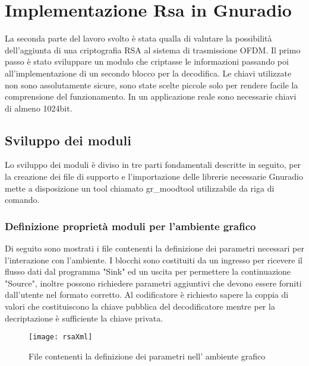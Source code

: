 \chapter{Implementazione Rsa in Gnuradio}
\label{cha:999}
La seconda parte del lavoro svolto è stata qualla di valutare la possibilità dell'aggiunta di una criptografia RSA al sistema di trasmissione OFDM. Il primo passo è stato sviluppare un modulo che criptasse le informazioni passando poi all'implementazione di un secondo blocco per la decodifica. Le chiavi utilizzate non sono assolutamente sicure, sono state scelte piccole solo per rendere facile la comprensione del funzionamento. In un applicazione reale sono necessarie chiavi di almeno 1024bit.
\section{Sviluppo dei moduli}
Lo sviluppo dei moduli è diviso in tre parti fondamentali descritte in seguito, per la creazione dei file di supporto e l'importazione delle librerie necessarie Gnuradio mette a disposizione un tool chiamato gr\_moodtool utilizzabile da riga di comando.
\subsection{Definizione proprietà moduli per l'ambiente grafico}
Di seguito sono mostrati i file contenenti la definizione dei parametri necessari per l'interazione con l'ambiente. I blocchi sono costituiti da un ingresso per ricevere il flusso dati dal programma "Sink" ed un uscita per permettere la continuazione "Source", inoltre possono richiedere parametri aggiuntivi che devono essere forniti dall'utente nel formato corretto.
Al codificatore è richiesto sapere la coppia di valori che costituiscono la chiave pubblica del decodificatore mentre per la decriptazione è sufficiente la chiave privata.
\begin{figure}[h]
	\centering
	\texttt{[image: rsaXml]}
	\caption{File contenenti la definizione dei parametri nell' ambiente grafico}
\end{figure}
